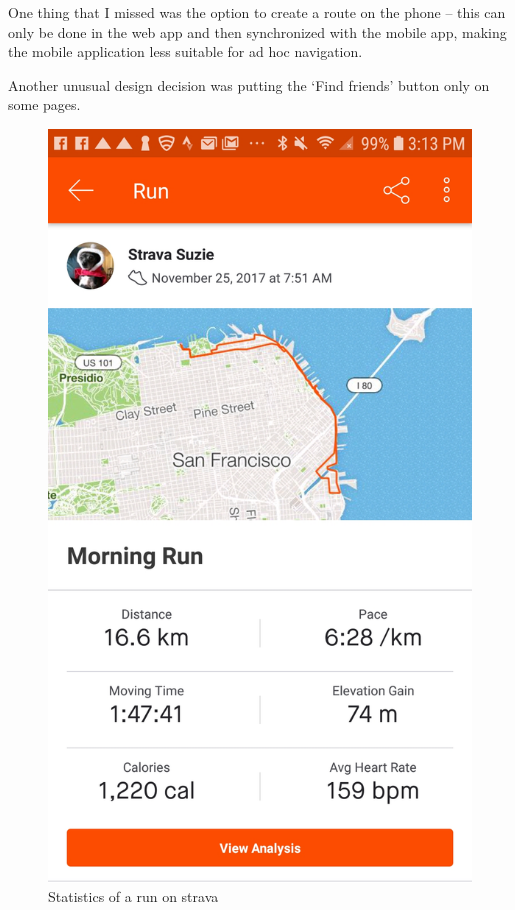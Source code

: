 One thing that I missed was the option to create a route on the phone -- this can only be done in the web app and then synchronized with the mobile app, making the mobile application less suitable for ad hoc navigation.

Another unusual design decision was putting the `Find friends' button only on some pages.

\begin{figure}[h]
    \includegraphics[width=\textwidth]{Images/strava-morning-run-stats.jpg}
    \caption{Statistics of a run on strava\cite{strava-run-stats-img}}
\end{figure}
